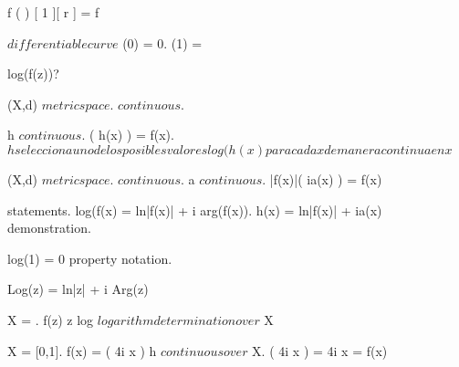 \documentclass[../Main/main]{subfiles}
\begin{document}
{	
	{
		{
			f \in \rational( \C )
		}
		{
			[ 1 ][ r ] = f
		}
	}
	
	
	{
		{
			\gamma $ differentiable curve $
		}
		{
			\gamma(0) = 0.
			\gamma(1) = \infty
		}
	}
	
	
	log(f(z))?\\

	{
		{
			(X,d) $ metric space $.
			 $ continuous $.
		}
		{
			h $ continuous $.
			\exp( h(x) ) = f(x).
			$ h selecciona uno de los posibles valores log(h(x) para cada x de manera continua en x $

		}
	}
	
	
	{
		{
			(X,d) $ metric space $.
			 $ continuous $.
		}
		{
			a $ continuous $.
			|f(x)|\exp( ia(x) ) = f(x)
		}
	}
	
	
	{
		{
			statements.
		}
		\holds
		{
			log(f(x) = ln|f(x)| + i arg(f(x)).
			h(x) = ln|f(x)| + ia(x)
		}
		\demonstration
		{
			demonstration.
		}
	}
	
	
	{
		{
		}
		{
			log(1) = 0
		}
		\denote
		{
			property \as notation.
		}
	}
	
	
	{
		{
		}
		{
			Log(z) = ln|z| + i Arg(z)
		}
	}
	
	
	{
		{
			X = \C \nonzero.
			f(z) \as z
		}
		\holds
		{
			\nexists \; log $ logarithm determination over $ X
		}
	}
	
	
	{
		{
			X = [0,1].
			f(x) = \exp( 4\pi i x )
		}
		{
			h $ continuous over $ X.
			\exp( 4\pi i x ) = 4\pi i x = f(x)
		}
	}
	
}
\end{document}
